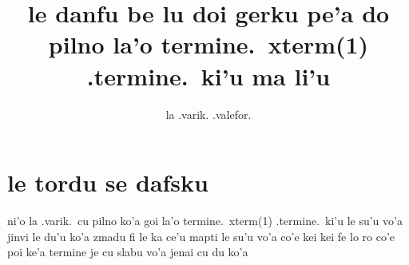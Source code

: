 \documentclass{article}
\title{le danfu be lu doi gerku pe'a do pilno la'o termine.\ xterm(1) .termine.\ ki'u ma li'u}
\author{la .varik. .valefor.}
\begin{document}
\maketitle

\section{le tordu se dafsku}
ni'o la .varik.\ cu pilno ko'a goi la'o termine.\ xterm(1) .termine.\ ki'u le su'u vo'a jinvi le du'u ko'a zmadu fi le ka ce'u mapti le su'u vo'a co'e kei kei fe lo ro co'e poi ke'a termine je cu slabu vo'a jenai cu du ko'a
\end{document}
